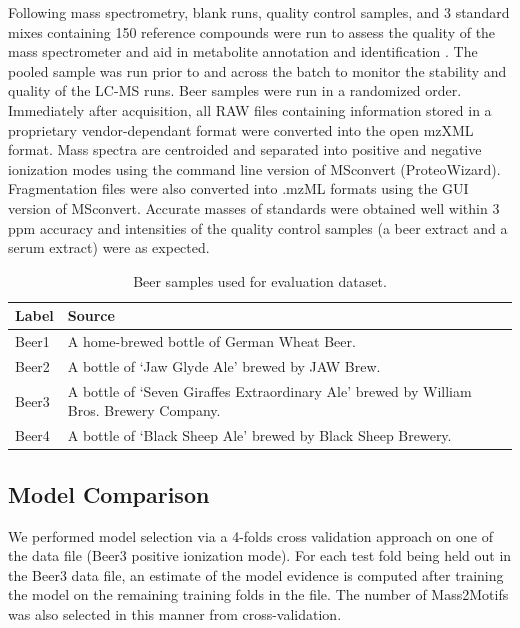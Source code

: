 Following mass spectrometry, blank runs, quality control samples, and 3 standard mixes containing 150 reference compounds were run to assess the quality of the mass spectrometer and aid in metabolite annotation and identification \cite{Creek2011}. The pooled sample was run prior to and across the batch to monitor the stability and quality of the LC-MS runs. Beer samples were run in a randomized order. Immediately after acquisition, all RAW files containing information stored in a proprietary vendor-dependant format were converted into the open mzXML format. Mass spectra are centroided and separated into positive and negative ionization modes using the command line version of MSconvert (ProteoWizard). Fragmentation files were also converted into .mzML formats using the GUI version of MSconvert.  Accurate masses of standards were obtained well within 3 ppm accuracy and intensities of the quality control samples (a beer extract and a serum extract) were as expected. 

\begin{table}[!htbp]
\small
\centering
\begin{tabular}{|l|l|}
\hline
\textbf{Label} & \textbf{Source}                                                                                                                                                                                        \\ \hline
Beer1          & A home-brewed bottle of German Wheat Beer. \\ \hline
Beer2          & A bottle of `Jaw Glyde Ale’ brewed by JAW Brew. \\ \hline
Beer3          & A bottle of `Seven Giraffes Extraordinary Ale’ brewed by William Bros. Brewery Company. \\ \hline
Beer4          & A bottle of `Black Sheep Ale’ brewed by Black Sheep Brewery. \\ \hline
\end{tabular}
\caption{Beer samples used for evaluation dataset.}
\label{tab:beer-sample-details}
\end{table}

\subsection{Model Comparison}

We performed model selection via a 4-folds cross validation approach on one of the data file (Beer3 positive ionization mode). For each test fold being held out in the Beer3 data file, an estimate of the model evidence is computed after training the model on the remaining training folds in the file. The number of Mass2Motifs was also selected in this manner from cross-validation. 

